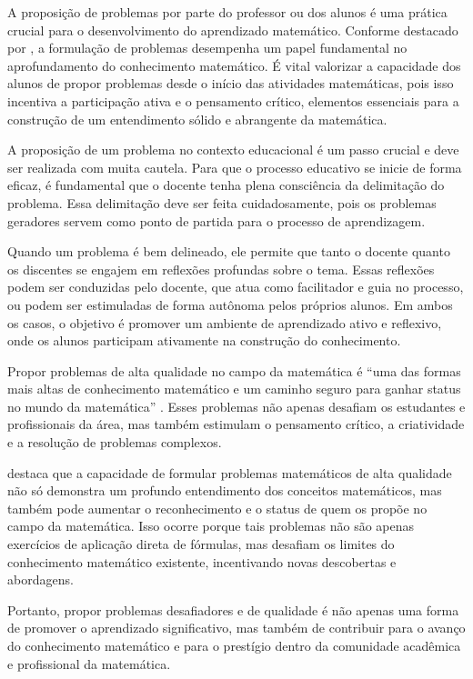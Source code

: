 A proposição de problemas por parte do professor ou dos alunos é uma prática crucial para o desenvolvimento do aprendizado matemático. Conforme destacado por \cite{CAI-etal2015}, a formulação de problemas desempenha um papel fundamental no aprofundamento do conhecimento matemático. É vital valorizar a capacidade dos alunos de propor problemas desde o início das atividades matemáticas, pois isso incentiva a participação ativa e o pensamento crítico, elementos essenciais para a construção de um entendimento sólido e abrangente da matemática.

A proposição de um problema no contexto educacional é um passo crucial e deve ser realizada com muita cautela. Para que o processo educativo se inicie de forma eficaz, é fundamental que o docente tenha plena consciência da delimitação do problema. Essa delimitação deve ser feita cuidadosamente, pois os problemas geradores servem como ponto de partida para o processo de aprendizagem.

Quando um problema é bem delineado, ele permite que tanto o docente quanto os discentes se engajem em reflexões profundas sobre o tema. Essas reflexões podem ser conduzidas pelo docente, que atua como facilitador e guia no processo, ou podem ser estimuladas de forma autônoma pelos próprios alunos. Em ambos os casos, o objetivo é promover um ambiente de aprendizado ativo e reflexivo, onde os alunos participam ativamente na construção do conhecimento.

Propor problemas de alta qualidade no campo da matemática é ``uma das formas mais altas de conhecimento matemático e um caminho seguro para ganhar
status no mundo da matemática'' \cite[p. 494]{CRESPO2015}. Esses problemas não apenas desafiam os estudantes e profissionais da área, mas também estimulam o pensamento crítico, a criatividade e a resolução de problemas complexos.

 destaca que a capacidade de formular problemas matemáticos de alta qualidade não só demonstra um profundo entendimento dos conceitos matemáticos, mas também pode aumentar o reconhecimento e o status de quem os propõe no campo da matemática. Isso ocorre porque tais problemas não são apenas exercícios de aplicação direta de fórmulas, mas desafiam os limites do conhecimento matemático existente, incentivando novas descobertas e abordagens.

Portanto, propor problemas desafiadores e de qualidade é não apenas uma forma de promover o aprendizado significativo, mas também de contribuir para o avanço do conhecimento matemático e para o prestígio dentro da comunidade acadêmica e profissional da matemática.

